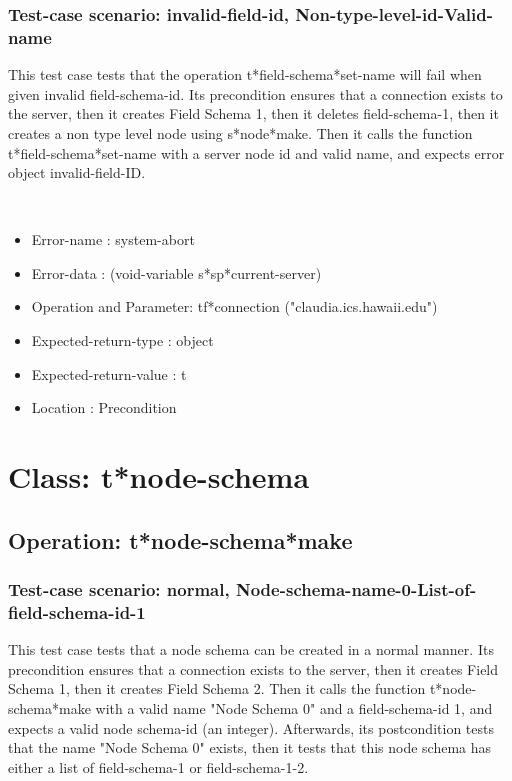 \subsubsection {Test-case scenario: invalid-field-id, Non-type-level-id-Valid-name}


This test case tests that the operation t*field-schema*set-name will fail when given invalid field-schema-id.
Its precondition ensures that a connection exists to the server, then it creates Field Schema 1, then it deletes field-schema-1, then it creates a non type level node using s*node*make.
Then it calls the function t*field-schema*set-name  with a server node id and valid name, and expects error object invalid-field-ID.



\
\begin {itemize}
\item 	Error-name             : system-abort
\item Error-data             : (void-variable s*sp*current-server)
\item Operation and Parameter: tf*connection ("claudia.ics.hawaii.edu")
\item Expected-return-type   : object
\item Expected-return-value  : t
\item Location               : Precondition



\end {itemize}
\section {Class: t*node-schema}
\subsection {Operation: t*node-schema*make}
\subsubsection {Test-case scenario: normal, Node-schema-name-0-List-of-field-schema-id-1}


This test case tests that a node schema can be created in a normal manner.
Its precondition ensures that a connection exists to the server, then it creates Field Schema 1, then it creates Field Schema 2.
Then it calls the function t*node-schema*make  with a valid name "Node Schema 0" and a field-schema-id 1, and expects a valid node schema-id (an integer).
Afterwards, its postcondition tests that the name "Node Schema 0" exists, then it tests that this node schema has either a list of field-schema-1 or field-schema-1-2.


